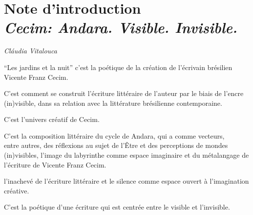 \chapter*{Note d'introduction\\
\emph{Cecim: Andara. Visible. Invisible.}}


\begin{flushright}
\emph{Cláudia Vitalouca}
\end{flushright}

\bigskip
\bigskip

\noindent{}``Les jardins et la nuit'' c'est la poétique de la création de
l'écrivain brésilien Vicente Franz Cecim.

\noindent{}C'est comment se construit l'écriture littéraire de l'auteur par le
biais de l'encre (in)visible, dans sa relation avec la littérature brésilienne contemporaine.

\noindent{}C'est l'univers créatif de Cecim.

\noindent{}C'est la composition littéraire du cycle de Andara, qui a comme vecteurs,\\
\noindent{}entre autres, des réflexions au sujet de l'Être et des perceptions de mondes\\
\noindent{}(in)visibles, l'image du labyrinthe comme espace imaginaire et du métalangage de l'écriture de Vicente Franz Cecim.

\noindent{}l'inachevé de l'écriture littéraire et le silence comme espace ouvert à l'imagination créative.

\noindent{}C'est la poétique d'une écriture qui est centrée entre le visible et l'invisible.

